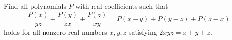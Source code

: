 Find all polynomials $P$ with real coefficients such that $$\frac{P(x)}{yz}+\frac{P(y)}{zx}+\frac{P(z)}{xy}=P(x-y)+P(y-z)+P(z-x)$$holds for all nonzero real numbers $x,y,z$ satisfying $2xyz=x+y+z$.